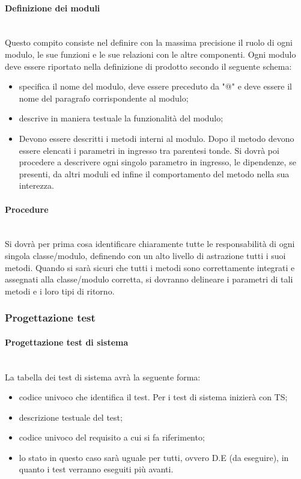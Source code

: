 \paragraph{Definizione dei moduli} \hfill \\
\label{}
Questo compito consiste nel definire con la massima precisione il ruolo di ogni modulo, le sue funzioni e le sue relazioni con le altre componenti.
Ogni modulo deve essere riportato nella definizione di prodotto secondo il seguente schema:
\begin{itemize}
\item {}specifica il nome del modulo, deve essere preceduto da "@" e deve essere il nome del paragrafo corrispondente al modulo;
\item {}descrive in maniera testuale la funzionalità del modulo;
\item {} Devono essere descritti i metodi interni al modulo. Dopo il metodo devono essere elencati i parametri in ingresso tra parentesi tonde.
Si dovrà poi procedere a descrivere ogni singolo parametro in ingresso, le dipendenze, se presenti, da altri moduli ed infine il comportamento del metodo nella sua interezza.
\end{itemize}


\paragraph{Procedure} \hfill \\
Si dovrà per prima cosa identificare chiaramente tutte le responsabilità di ogni singola classe/modulo, definendo con un alto livello di astrazione tutti i suoi metodi.
Quando si sarà sicuri che tutti i metodi sono correttamente integrati e assegnati alla classe/modulo corretta, si dovranno delineare i parametri di tali metodi e i loro tipi di ritorno.

\subsubsection{Progettazione test}
\label{prog_test}
\paragraph{Progettazione test di sistema} \hfill \\
La tabella dei test di sistema avrà la seguente forma:
\begin{itemize}
\item {}codice univoco che identifica il test. Per i test di sistema inizierà con TS;
\item {} descrizione testuale del test;
\item {}codice univoco del requisito a cui si fa riferimento;
\item {}lo stato in questo caso sarà uguale per tutti, ovvero D.E (da eseguire), in quanto i test verranno eseguiti più avanti.
\end{itemize}


